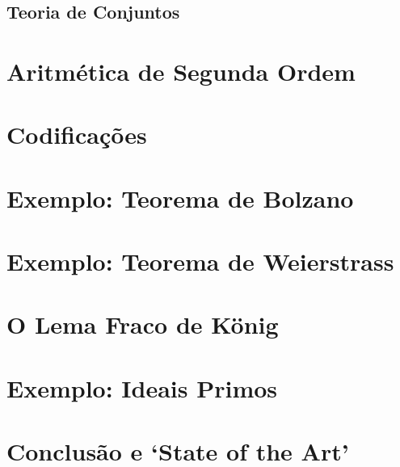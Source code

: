 \subsection*{Teoria de Conjuntos}

\section*{Aritmética de Segunda Ordem}

\section*{Codificações}

\section*{Exemplo: Teorema de Bolzano}

\section*{Exemplo: Teorema de Weierstrass}

\section*{O Lema Fraco de König}

\section*{Exemplo: Ideais Primos}

\section*{Conclusão e `State of the Art'}

\thechapterbibliography{}
